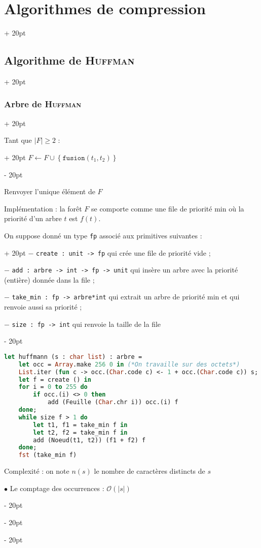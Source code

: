 \documentclass[a4paper, 12pt, twoside]{article}
\newcommand{\set}[1]{\left\{ #1 \right\}}
\newcommand{\abs}[1]{\left\lvert #1 \right\rvert}
\renewcommand{\ge}{\geqslant}
\newcommand{\ind}[1][20pt]{\advance\leftskip + #1}
\newcommand{\deind}[1][20pt]{\advance\leftskip - #1}
\newenvironment{indt}[2][20pt]{#2 \par \ind[#1]}{\par \deind} %
\begin{document}
\begin{indt}{\section{Algorithmes de compression}}
\begin{indt}{\subsection{Algorithme de \textsc{Huffman}}}
\begin{indt}{\subsubsection{Arbre de \textsc{Huffman}}}
\begin{pseudocode}
\begin{indt}{Tant que $\abs F \ge 2$ :}
                        $F \leftarrow F \cup \set{\mathtt{fusion}(t_1, t_2)}$
                    \end{indt}

                    \vspace{6pt}
                    
                    Renvoyer l'unique élément de $F$
                \end{pseudocode}

                \vspace{6pt}
                
                Implémentation : la forêt $F$ se comporte comme une file de priorité min où la priorité d'un arbre $t$ est $f(t)$.

                \begin{indt}{On suppose donné un type \texttt{fp} associé aux primitives suivantes :}
                    $-$ \texttt{create : unit -> fp} qui crée une file de priorité vide ;

                    $-$ \texttt{add : arbre -> int -> fp -> unit} qui insère un arbre avec la priorité (entière) donnée dans la file ;

                    $-$ \texttt{take\_min : fp -> arbre*int} qui extrait un arbre de priorité min et qui renvoie aussi sa priorité ;

                    $-$ \texttt{size : fp -> int} qui renvoie la taille de la file
                \end{indt}

                \begin{lstlisting}[language=Caml, xleftmargin=80pt]
let huffmann (s : char list) : arbre =
    let occ = Array.make 256 0 in (*On travaille sur des octets*)
    List.iter (fun c -> occ.(Char.code c) <- 1 + occ.(Char.code c)) s;
    let f = create () in
    for i = 0 to 255 do
        if occ.(i) <> 0 then
            add (Feuille (Char.chr i)) occ.(i) f
    done;
    while size f > 1 do
        let t1, f1 = take_min f in
        let t2, f2 = take_min f in
        add (Noeud(t1, t2)) (f1 + f2) f
    done;
    fst (take_min f)\end{lstlisting}

                Complexité : on note $n(s)$ le nombre de caractères distincts de $s$

                \vspace{6pt}
                
                $\bullet$ Le comptage des occurrences : $\mathcal O(\abs s)$


\end{indt}
\end{indt}
\end{indt}
\end{document}
